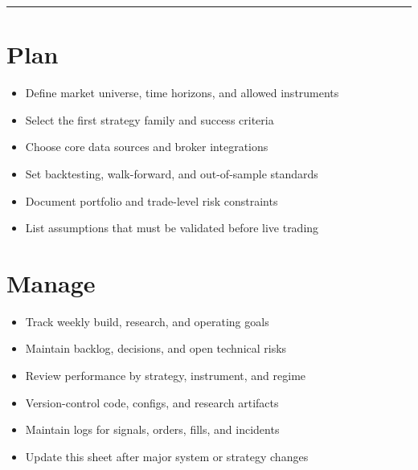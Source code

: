 \documentclass[10pt]{article}
\newcommand{\checkitem}[1]{\item[$\square$] #1}
\begin{document}
\vspace{2pt}
\hrule
\vspace{4pt}

\begin{minipage}[t]{0.49\textwidth}
\section*{Plan}
\begin{itemize}
    \checkitem{Define market universe, time horizons, and allowed instruments}
    \checkitem{Select the first strategy family and success criteria}
    \checkitem{Choose core data sources and broker integrations}
    \checkitem{Set backtesting, walk-forward, and out-of-sample standards}
    \checkitem{Document portfolio and trade-level risk constraints}
    \checkitem{List assumptions that must be validated before live trading}
\end{itemize}

\section*{Manage}
\begin{itemize}
    \checkitem{Track weekly build, research, and operating goals}
    \checkitem{Maintain backlog, decisions, and open technical risks}
    \checkitem{Review performance by strategy, instrument, and regime}
    \checkitem{Version-control code, configs, and research artifacts}
    \checkitem{Maintain logs for signals, orders, fills, and incidents}
    \checkitem{Update this sheet after major system or strategy changes}
\end{itemize}
\end{minipage}\hfill
\end{document}
